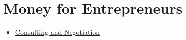 \documentclass[]{book}
\providecommand{\tightlist}{%
  \setlength{\itemsep}{0pt}\setlength{\parskip}{0pt}}
\theoremstyle{definition}
\theoremstyle{definition}
\theoremstyle{definition}
\theoremstyle{remark}
\begin{document}
\section{Money for Entrepreneurs}\label{money-for-entrepreneurs}

\begin{itemize}
\tightlist
\item
  \href{http://www.singlefounder.com/tips-on-negotiating-a-great-consulting-rate/}{Consulting
  and Negotiation}
\end{itemize}


\end{document}
